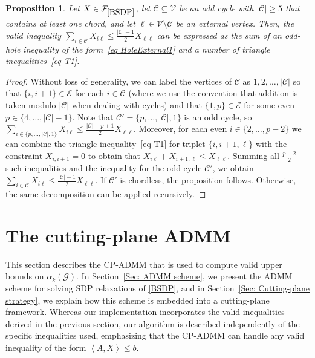 \documentclass[11pt, a4paper]{article}
\newtheorem{proposition}[theorem]{Proposition}
\newcommand{\IP}[2]{\left\langle #1, #2 \right\rangle}
\newcommand{\mc}{\mathcal}
\begin{document}
\begin{proposition} \label{Prop: no cycles with chords}
    Let $X \in \mc{F}_{\eqref{BSDP}}$, let $\mc{C} \subseteq \mc{V}$ be an odd cycle with $|\mc{C}| \geq 5$ that contains at least one chord, and let $\ell \in \mc{V}\setminus \mc{C}$ be an external vertex. 
    Then, the valid inequality $\sum_{i \in \mc{C}} X_{i\ell} \leq \frac{|\mc{C}|-1}{2} X_{\ell\ell}$ can be expressed as the sum of an odd-hole inequality of the form~\eqref{eq HoleExternal1} and a number of triangle inequalities~\eqref{eq T1}.   
\end{proposition}
\begin{proof}
    Without loss of generality, we can label the vertices of $\mc{C}$ as $1, 2, \dots, |\mc{C}|$ so that $\{i,i+1\} \in \mc{E}$ for each $i \in \mc{C}$ (where we use the convention that addition is taken modulo $|\mc{C}|$ when dealing with cycles) and that $\{1,p\} \in \mc{E}$ for some even $p \in \{4, \hdots, |\mc{C}|-1\}$.
    Note that $\mc{C}' = \{p, \hdots, |\mc{C}|, 1\}$ is an odd cycle, so $\sum_{i \in \{p, \hdots, |\mc{C}|, 1\}} X_{i\ell} \leq \frac{|\mc{C}|-p+1}{2}X_{\ell\ell}$. 
    Moreover, for each even $i \in \{2, \hdots, p-2\}$ we can combine the triangle inequality~\eqref{eq T1} for triplet $\{i,i+1, \ell\}$ with the constraint $X_{i,i+1} = 0$ to obtain that $X_{i\ell} + X_{i+1, \ell} \leq X_{\ell\ell}$. 
    Summing all $\frac{p-2}{2}$ such inequalities and the inequality for the odd cycle $\mc{C}'$, we obtain $\sum_{i \in \mc{C}} X_{i\ell} \leq \frac{|\mc{C}|-1}{2}X_{\ell\ell}$.
    If $\mc{C}'$ is chordless, the proposition follows. 
    Otherwise, the same decomposition can be applied recursively.
\end{proof}

\section{The cutting-plane ADMM} \label{Sec: CP-ADMM}
This section describes the CP-ADMM that is used to compute valid upper bounds on $\alpha_k(\mc{G})$.
In Section~\ref{Sec: ADMM scheme}, we present the ADMM scheme for solving SDP relaxations of \eqref{BSDP}, and in Section~\ref{Sec: Cutting-plane strategy}, we explain how this scheme is embedded into a cutting-plane framework.
Whereas our implementation incorporates the valid inequalities derived in the previous section, our algorithm is described independently of the specific inequalities used, emphasizing that the CP-ADMM can handle any valid inequality of the form $\IP{A}{X} \leq b$.
\end{document}

